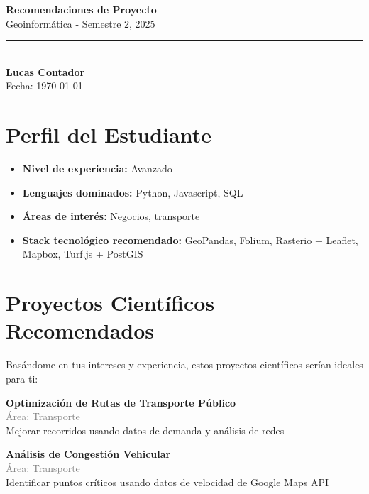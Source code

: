 \documentclass[11pt,a4paper]{article}
\begin{document}
\begin{center}
    {\Huge \textbf{Recomendaciones de Proyecto}}\\[0.5cm]
    {\Large \textcolor{usachblue}{Geoinformática - Semestre 2, 2025}}\\[0.3cm]
    \rule{\textwidth}{0.5pt}\\[0.3cm]
    {\LARGE \textbf{Lucas Contador}}\\[0.2cm]
    {\large Fecha: \today}
\end{center}

\vspace{0.5cm}

\section*{ Perfil del Estudiante}

\begin{tcolorbox}[colback=blue!5,colframe=usachblue,title=Resumen de tu Perfil]
\begin{itemize}[leftmargin=*]
    \item \textbf{Nivel de experiencia:} Avanzado
    \item \textbf{Lenguajes dominados:} Python, Javascript, SQL
    \item \textbf{Áreas de interés:} Negocios, transporte
    \item \textbf{Stack tecnológico recomendado:} GeoPandas, Folium, Rasterio + Leaflet, Mapbox, Turf.js + PostGIS
\end{itemize}
\end{tcolorbox}


\section*{ Proyectos Científicos Recomendados}

Basándome en tus intereses y experiencia, estos proyectos científicos serían ideales para ti:


\begin{tcolorbox}[colback=green!5,colframe=darkgreen,title={\small Proyecto Científico \#1}]
\textbf{Optimización de Rutas de Transporte Público}\\[0.2cm]
\textcolor{gray}{\small Área: Transporte}\\[0.2cm]
Mejorar recorridos usando datos de demanda y análisis de redes
\end{tcolorbox}


\begin{tcolorbox}[colback=green!5,colframe=darkgreen,title={\small Proyecto Científico \#2}]
\textbf{Análisis de Congestión Vehicular}\\[0.2cm]
\textcolor{gray}{\small Área: Transporte}\\[0.2cm]
Identificar puntos críticos usando datos de velocidad de Google Maps API
\end{tcolorbox}
\end{document}
